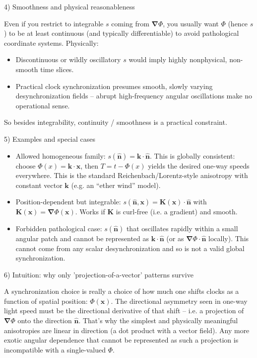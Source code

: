 \documentclass[a4paper]{article}
\theoremstyle{plain}
\theoremstyle{definition}
\newcommand{\vect}[1]{\mathbf{#1}}
\newcommand{\hatvec}[1]{\hat{\mathbf{#1}}}
\newcommand{\del}{\bm{\nabla}}
\begin{document}
4) Smoothness and physical reasonableness

Even if you restrict to integrable $s$ coming from $\del \Phi$, you
usually want $\Phi$ (hence $s$) to be at least continuous (and
typically differentiable) to avoid pathological coordinate systems.
Physically:
\begin{itemize}
\item Discontinuous or wildly oscillatory $s$ would imply highly
  nonphysical, non-smooth time slices.
\item Practical clock synchronization presumes smooth, slowly varying
  desynchronization fields -- abrupt high-frequency angular
  oscillations make no operational sense.
\end{itemize}
So besides integrability, continuity / smoothness is a practical
constraint.

5) Examples and special cases

\begin{itemize}
\item Allowed homogeneous family: $s(\hatvec{n}) = \vect{k} \cdot
  \hatvec{n}$.  This is globally consistent: choose
  $\Phi(x) = \vect{k} \cdot \vect{x}$, then $T = t - \Phi(x)$ yields
  the desired one-way speeds everywhere.  This is the standard
  Reichenbach/Lorentz-style anisotropy with constant vector $\vect{k}$
  (e.g. an ``ether wind'' model).
\item Position-dependent but integrable:
  $s(\hatvec{n}, \vect{x}) = \vect{K}(\vect{x}) \cdot \hatvec{n}$
  with $\vect{K}(\vect{x}) = \del \Phi(\vect{x})$.  Works if
  $\vect{K}$ is curl-free (i.e. a gradient) and smooth.
\item Forbidden pathological case: $s(\hatvec{n})$ that oscillates
  rapidly within a small angular patch and cannot be represented as
  $\vect{k} \cdot \hatvec{n}$ (or as $\del \Phi \cdot \hatvec{n}$
  locally).  This cannot come from any scalar desynchronization and so
  is not a valid global synchronization.
\end{itemize}

6) Intuition: why only 'projection-of-a-vector' patterns survive

A synchronization choice is really a choice of how much one shifts
clocks as a function of spatial position: $\Phi(\vect{x})$.  The
directional asymmetry seen in one-way light speed must be the
directional derivative of that shift -- i.e. a projection of $\del
\Phi$ onto the direction $\hatvec{n}$.  That's why the simplest and
physically meaningful anisotropies are linear in direction (a dot
product with a vector field). Any more exotic angular dependence that
cannot be represented as such a projection is incompatible with a
single-valued $\Phi$.
\end{document}
